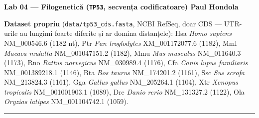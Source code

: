 \documentclass[10pt,a4paper]{article}
\begin{document}
\small

{\large\bfseries Lab 04 — Filogenetică (\texttt{TP53}, secvența codificatoare) \hfill Paul Hondola}\par\vspace{2pt}
{\footnotesize\textbf{Dataset propriu} (\texttt{data/tp53\_cds.fasta}, NCBI RefSeq, doar CDS — UTR-urile au lungimi foarte diferite și ar domina distanțele):
Hsa \emph{Homo sapiens} NM\_000546.6 (1182 nt), Ptr \emph{Pan troglodytes} XM\_001172077.6 (1182), Mml \emph{Macaca mulatta} NM\_001047151.2 (1182),
Mmu \emph{Mus musculus} NM\_011640.3 (1173), Rno \emph{Rattus norvegicus} NM\_030989.4 (1176), Cfa \emph{Canis lupus familiaris} NM\_001389218.1 (1146),
Bta \emph{Bos taurus} NM\_174201.2 (1161), Ssc \emph{Sus scrofa} NM\_213824.3 (1161), Gga \emph{Gallus gallus} NM\_205264.1 (1104),
Xtr \emph{Xenopus tropicalis} NM\_001001903.1 (1089), Dre \emph{Danio rerio} NM\_131327.2 (1122), Ola \emph{Oryzias latipes} NM\_001104742.1 (1059).}\par
\vspace{2pt}\hrule\vspace{2pt}
\end{document}
